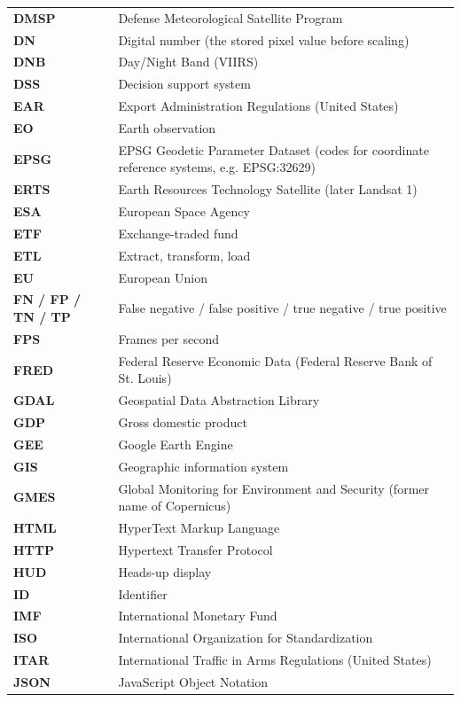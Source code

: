 {\begin{longtable}{>{\raggedright\arraybackslash}p{3.68cm}>{\raggedright\arraybackslash}p{10.52cm}}
\textbf{DMSP} & Defense Meteorological Satellite Program \\
\textbf{DN} & Digital number (the stored pixel value before scaling) \\
\textbf{DNB} & Day/Night Band (VIIRS) \\
\textbf{DSS} & Decision support system \\
\textbf{EAR} & Export Administration Regulations (United States) \\
\textbf{EO} & Earth observation \\
\textbf{EPSG} & EPSG Geodetic Parameter Dataset (codes for coordinate reference systems, e.g. EPSG:32629) \\
\textbf{ERTS} & Earth Resources Technology Satellite (later Landsat 1) \\
\textbf{ESA} & European Space Agency \\
\textbf{ETF} & Exchange-traded fund \\
\textbf{ETL} & Extract, transform, load \\
\textbf{EU} & European Union \\
\textbf{FN / FP / TN / TP} & False negative / false positive / true negative / true positive \\
\textbf{FPS} & Frames per second \\
\textbf{FRED} & Federal Reserve Economic Data (Federal Reserve Bank of St. Louis) \\
\textbf{GDAL} & Geospatial Data Abstraction Library \\
\textbf{GDP} & Gross domestic product \\
\textbf{GEE} & Google Earth Engine \\
\textbf{GIS} & Geographic information system \\
\textbf{GMES} & Global Monitoring for Environment and Security (former name of Copernicus) \\
\textbf{HTML} & HyperText Markup Language \\
\textbf{HTTP} & Hypertext Transfer Protocol \\
\textbf{HUD} & Heads-up display \\
\textbf{ID} & Identifier \\
\textbf{IMF} & International Monetary Fund \\
\textbf{ISO} & International Organization for Standardization \\
\textbf{ITAR} & International Traffic in Arms Regulations (United States) \\
\textbf{JSON} & JavaScript Object Notation \\

\end{longtable}}
